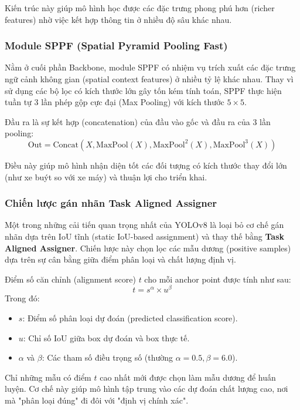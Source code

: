 Kiến trúc này giúp mô hình học được các đặc trưng phong phú hơn (richer features) nhờ việc kết hợp thông tin ở nhiều độ sâu khác nhau.

\subsubsection{Module SPPF (Spatial Pyramid Pooling Fast)}
Nằm ở cuối phần Backbone, module SPPF có nhiệm vụ trích xuất các đặc trưng ngữ cảnh không gian (spatial context features) ở nhiều tỷ lệ khác nhau. Thay vì sử dụng các bộ lọc có kích thước lớn gây tốn kém tính toán, SPPF thực hiện tuần tự 3 lần phép gộp cực đại (Max Pooling) với kích thước $5 \times 5$.

Đầu ra là sự kết hợp (concatenation) của đầu vào gốc và đầu ra của 3 lần pooling:
\begin{equation}
    \text{Out} = \text{Concat}(X, \text{MaxPool}(X), \text{MaxPool}^2(X), \text{MaxPool}^3(X))
\end{equation}

Điều này giúp mô hình nhận diện tốt các đối tượng có kích thước thay đổi lớn (như xe buýt so với xe máy) và thuận lợi cho triển khai.

\subsubsection{Chiến lược gán nhãn Task Aligned Assigner}
Một trong những cải tiến quan trọng nhất của YOLOv8 là loại bỏ cơ chế gán nhãn dựa trên IoU tĩnh (static IoU-based assignment) và thay thế bằng \textbf{Task Aligned Assigner}. Chiến lược này chọn lọc các mẫu dương (positive samples) dựa trên sự cân bằng giữa điểm phân loại và chất lượng định vị.

Điểm số căn chỉnh (alignment score) $t$ cho mỗi anchor point được tính như sau:
\begin{equation}
    t = s^\alpha \times u^\beta
\end{equation}
Trong đó:
\begin{itemize}
    \item $s$: Điểm số phân loại dự đoán (predicted classification score).
    \item $u$: Chỉ số IoU giữa box dự đoán và box thực tế.
    \item $\alpha$ và $\beta$: Các tham số điều trọng số (thường $\alpha=0.5, \beta=6.0$).
\end{itemize}

Chỉ những mẫu có điểm $t$ cao nhất mới được chọn làm mẫu dương để huấn luyện. Cơ chế này giúp mô hình tập trung vào các dự đoán chất lượng cao, nơi mà "phân loại đúng" đi đôi với "định vị chính xác".

